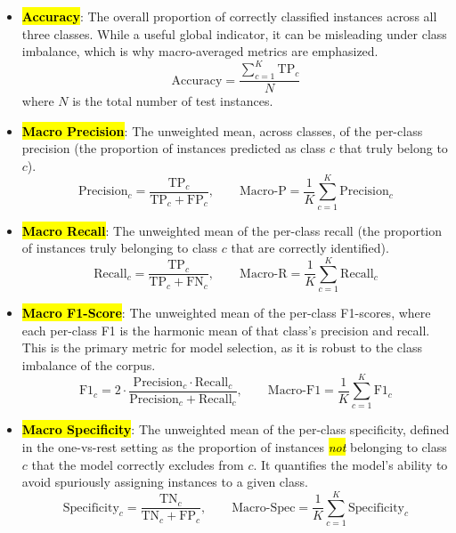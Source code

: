 \documentclass[informatics,article,accept,pdftex,moreauthors]{Definitions/mdpi}
\begin{document}
\begin{itemize}
    \item \textbf{\hl{Accuracy}}: The overall proportion of correctly classified instances across all three classes. While a useful global indicator, it can be misleading under class imbalance, which is why macro-averaged metrics are emphasized.
    \begin{equation}
        \text{Accuracy} = \frac{\sum_{c=1}^{K}\text{TP}_c}{N}
    \end{equation}
    where $N$ is the total number of test instances.
    \item \textbf{\hl{Macro Precision}}: The unweighted mean, across classes, of the per-class precision (the proportion of instances predicted as class $c$ that truly belong to $c$).
    \begin{equation}
        \text{Precision}_c = \frac{\text{TP}_c}{\text{TP}_c + \text{FP}_c}, \qquad
        \text{Macro-P} = \frac{1}{K}\sum_{c=1}^{K}\text{Precision}_c
    \end{equation}
    \item \textbf{\hl{Macro Recall}}: The unweighted mean of the per-class recall (the proportion of instances truly belonging to class $c$ that are correctly identified).
    \begin{equation}
        \text{Recall}_c = \frac{\text{TP}_c}{\text{TP}_c + \text{FN}_c}, \qquad
        \text{Macro-R} = \frac{1}{K}\sum_{c=1}^{K}\text{Recall}_c
    \end{equation}
    \item \textbf{\hl{Macro F1-Score}}: The unweighted mean of the per-class F1-scores, where each per-class F1 is the harmonic mean of that class's precision and recall. This is the primary metric for model selection, as it is robust to the class imbalance of the corpus.
    \begin{equation}
        \text{F1}_c = 2 \cdot \frac{\text{Precision}_c \cdot \text{Recall}_c}{\text{Precision}_c + \text{Recall}_c}, \qquad
        \text{Macro-F1} = \frac{1}{K}\sum_{c=1}^{K}\text{F1}_c
    \end{equation}
    \item \textbf{\hl{Macro Specificity}}: The unweighted mean of the per-class specificity, defined in the one-vs-rest setting as the proportion of instances \emph{\hl{not}} belonging to class $c$ that the model correctly excludes from $c$. It quantifies the model's ability to avoid spuriously assigning instances to a given class.
    \begin{equation}
        \text{Specificity}_c = \frac{\text{TN}_c}{\text{TN}_c + \text{FP}_c}, \qquad
        \text{Macro-Spec} = \frac{1}{K}\sum_{c=1}^{K}\text{Specificity}_c
    \end{equation}
\end{itemize}
\end{document}
